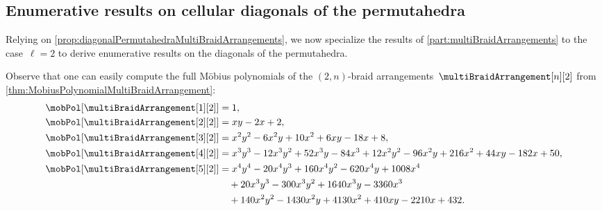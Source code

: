 
\subsection{Enumerative results on cellular diagonals of the permutahedra} 
\label{subsec:enumerationDiagonalPermutahedra}

Relying on \cref{prop:diagonalPermutahedraMultiBraidArrangements}, we now specialize the results of \cref{part:multiBraidArrangements} to the case~$\ell = 2$ to derive enumerative results on the diagonals of the permutahedra.

Observe that one can easily compute the full M\"obius polynomials of the $(2,n)$-braid arrangements~$\multiBraidArrangement[n][2]$ from \cref{thm:MobiusPolynomialMultiBraidArrangement}:
\begin{align*}
\allowdisplaybreaks
\mobPol[{\multiBraidArrangement[1][2]}] & = 1 , \\
\mobPol[{\multiBraidArrangement[2][2]}] & = x y - 2 x + 2 , \\
\mobPol[{\multiBraidArrangement[3][2]}] & = x^2 y^2 - 6 x^2 y + 10 x^2 + 6 x y - 18 x + 8 , \\
\mobPol[{\multiBraidArrangement[4][2]}] & = x^3 y^3 - 12 x^3 y^2 + 52 x^3 y - 84 x^3 + 12 x^2 y^2 - 96 x^2 y + 216 x^2 + 44 x y - 182 x + 50 , \\
\mobPol[{\multiBraidArrangement[5][2]}] & = x^4 y^4 - 20 x^4 y^3 + 160 x^4 y^2 - 620 x^4 y + 1008 x^4 \\ & \quad+ 20 x^3 y^3 - 300 x^3 y^2 + 1640 x^3 y - 3360 x^3 \\ & \quad+ 140 x^2 y^2 - 1430 x^2 y + 4130 x^2 + 410 x y - 2210 x + 432 .
\end{align*}
